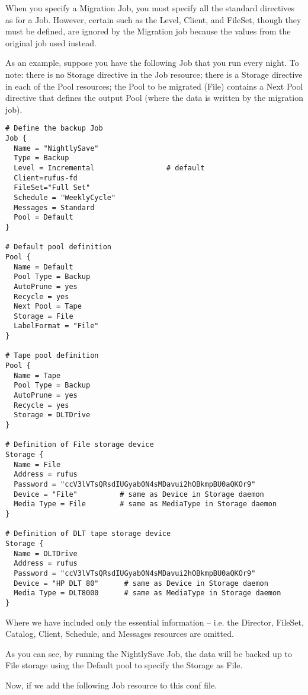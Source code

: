 When you specify a Migration Job, you must specify all the standard
directives as for a Job.  However, certain such as the Level, Client, and
FileSet, though they must be defined, are ignored by the Migration job
because the values from the original job used instead.

As an example, suppose you have the following Job that
you run every night. To note: there is no Storage directive in the
Job resource; there is a Storage directive in each of the Pool
resources; the Pool to be migrated (File) contains a Next Pool
directive that defines the output Pool (where the data is written
by the migration job).

\footnotesize
\begin{verbatim}
# Define the backup Job
Job {
  Name = "NightlySave"
  Type = Backup
  Level = Incremental                 # default
  Client=rufus-fd
  FileSet="Full Set"
  Schedule = "WeeklyCycle"
  Messages = Standard
  Pool = Default
}

# Default pool definition
Pool {
  Name = Default
  Pool Type = Backup
  AutoPrune = yes
  Recycle = yes
  Next Pool = Tape
  Storage = File
  LabelFormat = "File"
}

# Tape pool definition
Pool {
  Name = Tape
  Pool Type = Backup
  AutoPrune = yes
  Recycle = yes
  Storage = DLTDrive
}

# Definition of File storage device
Storage {
  Name = File
  Address = rufus
  Password = "ccV3lVTsQRsdIUGyab0N4sMDavui2hOBkmpBU0aQKOr9"
  Device = "File"          # same as Device in Storage daemon
  Media Type = File        # same as MediaType in Storage daemon
}

# Definition of DLT tape storage device
Storage {
  Name = DLTDrive
  Address = rufus
  Password = "ccV3lVTsQRsdIUGyab0N4sMDavui2hOBkmpBU0aQKOr9"
  Device = "HP DLT 80"      # same as Device in Storage daemon
  Media Type = DLT8000      # same as MediaType in Storage daemon
}

\end{verbatim}
\normalsize

Where we have included only the essential information -- i.e. the
Director, FileSet, Catalog, Client, Schedule, and Messages resources are
omitted.

As you can see, by running the NightlySave Job, the data will be backed up
to File storage using the Default pool to specify the Storage as File.

Now, if we add the following Job resource to this conf file.

